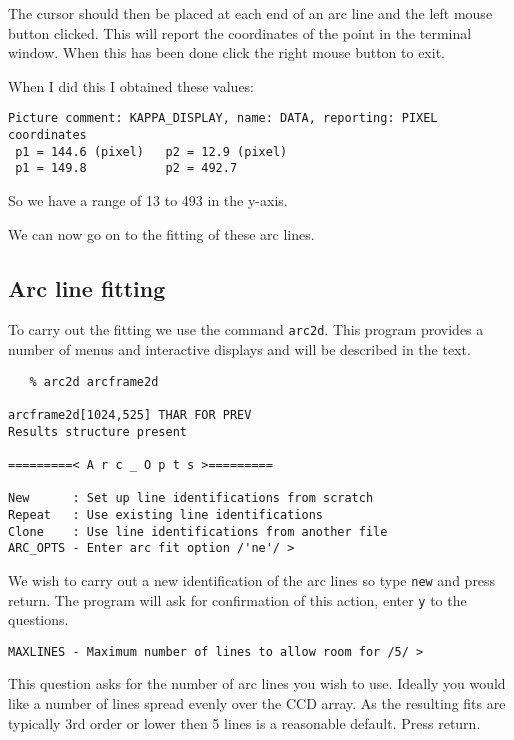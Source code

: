 The cursor should then be placed at each end of an arc line and the left mouse button clicked. This will report the coordinates of the point in the terminal window. When this has been done click the right mouse button to exit.

When I did this I obtained these values:

{
\scspec{\small}{ }
\begin{verbatim}
Picture comment: KAPPA_DISPLAY, name: DATA, reporting: PIXEL coordinates
 p1 = 144.6 (pixel)   p2 = 12.9 (pixel)
 p1 = 149.8           p2 = 492.7
\end{verbatim}
} 

So we have a range of 13 to 493 in the y-axis.

We can now go on to the fitting of these arc lines.

\subsection{Arc line fitting}

To carry out the fitting we use the  command {\tt arc2d}. This program provides a number of menus and interactive displays and will be described in the text.


{
\scspec{\small}{ }
\begin{verbatim}
   % arc2d arcframe2d      

arcframe2d[1024,525] THAR FOR PREV
Results structure present

=========< A r c _ O p t s >=========

New      : Set up line identifications from scratch
Repeat   : Use existing line identifications
Clone    : Use line identifications from another file
ARC_OPTS - Enter arc fit option /'ne'/ >

\end{verbatim}
}

We wish to carry out a new identification of the arc lines so type {\tt new} and press return. The program will ask for confirmation of this action, enter {\tt y} to the questions.

{
\scspec{\small}{ }
\begin{verbatim}
MAXLINES - Maximum number of lines to allow room for /5/ >
\end{verbatim}
}

This question asks for the number of arc lines you wish to use. Ideally you would like a number of lines spread evenly over the CCD array. As the resulting fits are typically 3rd order or lower then 5 lines is a reasonable default. Press return.

